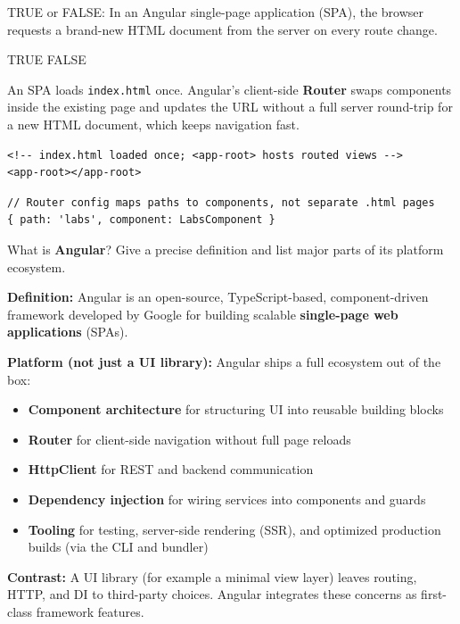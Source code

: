 


\question[4]
TRUE or FALSE: In an Angular single-page application (SPA), the browser requests a brand-new HTML document from the server on every route change.
\begin{choices}
  \choice TRUE
  \CorrectChoice FALSE
\end{choices}
\begin{solution}
  An SPA loads \texttt{index.html} once. Angular's client-side \textbf{Router} swaps components inside the existing page and updates the URL without a full server round-trip for a new HTML document, which keeps navigation fast.
\begin{lstlisting}[style=htmlinline]
<!-- index.html loaded once; <app-root> hosts routed views -->
<app-root></app-root>
\end{lstlisting}
\begin{lstlisting}[style=ts]
// Router config maps paths to components, not separate .html pages
{ path: 'labs', component: LabsComponent }
\end{lstlisting}
\end{solution}

\question[6]
What is \textbf{Angular}? Give a precise definition and list major parts of its platform ecosystem.
\begin{solutionorbox}[4.5in]
\textbf{Definition:} Angular is an open-source, TypeScript-based, component-driven framework developed by Google for building scalable \textbf{single-page web applications} (SPAs).

\textbf{Platform (not just a UI library):} Angular ships a full ecosystem out of the box:
\begin{itemize}
  \item \textbf{Component architecture} for structuring UI into reusable building blocks
  \item \textbf{Router} for client-side navigation without full page reloads
  \item \textbf{HttpClient} for REST and backend communication
  \item \textbf{Dependency injection} for wiring services into components and guards
  \item \textbf{Tooling} for testing, server-side rendering (SSR), and optimized production builds (via the CLI and bundler)
\end{itemize}

\textbf{Contrast:} A UI library (for example a minimal view layer) leaves routing, HTTP, and DI to third-party choices. Angular integrates these concerns as first-class framework features.
\end{solutionorbox}


